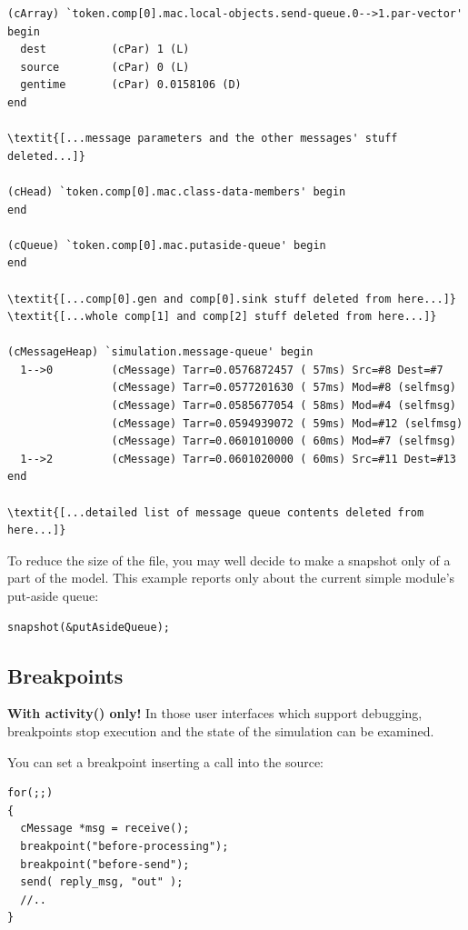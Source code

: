 \begin{Verbatim}[commandchars=\\\{\}]
(cArray) `token.comp[0].mac.local-objects.send-queue.0-->1.par-vector' begin
  dest          (cPar) 1 (L) 
  source        (cPar) 0 (L)
  gentime       (cPar) 0.0158106 (D)
end

\textit{[...message parameters and the other messages' stuff deleted...]}

(cHead) `token.comp[0].mac.class-data-members' begin
end

(cQueue) `token.comp[0].mac.putaside-queue' begin
end

\textit{[...comp[0].gen and comp[0].sink stuff deleted from here...]}
\textit{[...whole comp[1] and comp[2] stuff deleted from here...]}

(cMessageHeap) `simulation.message-queue' begin 
  1-->0         (cMessage) Tarr=0.0576872457 ( 57ms) Src=#8 Dest=#7
                (cMessage) Tarr=0.0577201630 ( 57ms) Mod=#8 (selfmsg)
                (cMessage) Tarr=0.0585677054 ( 58ms) Mod=#4 (selfmsg) 
                (cMessage) Tarr=0.0594939072 ( 59ms) Mod=#12 (selfmsg)
                (cMessage) Tarr=0.0601010000 ( 60ms) Mod=#7 (selfmsg)
  1-->2         (cMessage) Tarr=0.0601020000 ( 60ms) Src=#11 Dest=#13
end

\textit{[...detailed list of message queue contents deleted from here...]}
\end{Verbatim}

To reduce the size of the file, you may well decide to make a snapshot
only of a part of the model. This example
reports only about the current simple module's put-aside queue:

\begin{Verbatim}
snapshot(&putAsideQueue);
\end{Verbatim}





\subsection{Breakpoints}

\textbf{With activity() only!} In those user interfaces which support 
debugging, breakpoints stop execution and the state of the simulation 
can be examined.

You can set a breakpoint inserting a
 call into the source:

\begin{Verbatim}
for(;;)
{
  cMessage *msg = receive();
  breakpoint("before-processing");
  breakpoint("before-send");
  send( reply_msg, "out" );
  //..
}
\end{Verbatim}


